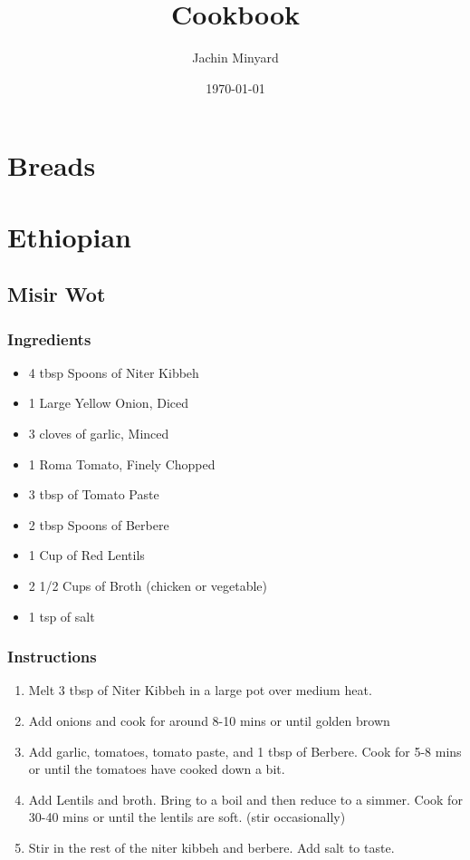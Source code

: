 \documentclass[11pt]{article}
\author{Jachin Minyard}
\date{\today}
\title{Cookbook}
\begin{document}
\maketitle

\section{Breads}
\label{sec:org7045467}
\section{Ethiopian}
\label{sec:org153cda2}
\subsection{Misir Wot}
\label{sec:orgba7ee17}
\subsubsection*{Ingredients}
\label{sec:org6077f03}
\begin{itemize}
\item 4 tbsp Spoons of Niter Kibbeh
\item 1 Large Yellow Onion, Diced
\item 3 cloves of garlic, Minced
\item 1 Roma Tomato, Finely Chopped
\item 3 tbsp of Tomato Paste
\item 2 tbsp Spoons of Berbere
\item 1 Cup of Red Lentils
\item 2 1/2 Cups of Broth (chicken or vegetable)
\item 1 tsp of salt
\end{itemize}
\subsubsection*{Instructions}
\label{sec:orgc90e535}
\begin{enumerate}
\item Melt 3 tbsp of Niter Kibbeh in a large pot over medium heat.
\item Add onions and cook for around 8-10 mins or until golden brown
\item Add garlic, tomatoes, tomato paste, and 1 tbsp of Berbere. Cook for 5-8 mins or until the tomatoes have cooked down a bit.
\item Add Lentils and broth. Bring to a boil and then reduce to a simmer. Cook for 30-40 mins or until the lentils are soft. (stir occasionally)
\item Stir in the rest of the niter kibbeh and berbere. Add salt to taste.
\end{enumerate}
\end{document}
